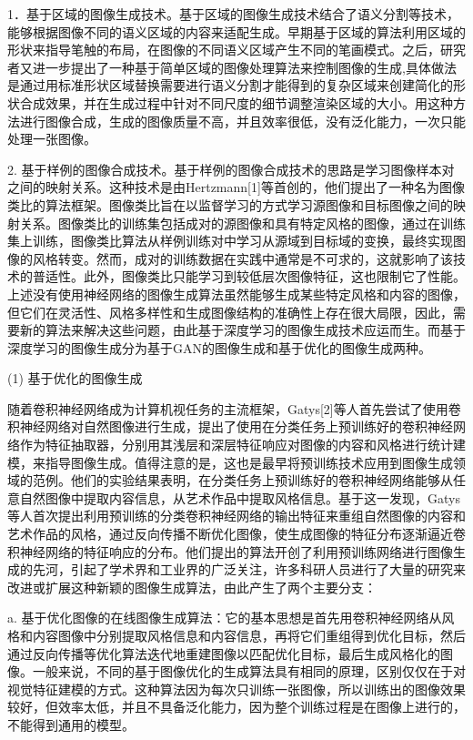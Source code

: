 1．基于区域的图像生成技术。基于区域的图像生成技术结合了语义分割等技术，能够根据图像不同的语义区域的内容来适配生成。早期基于区域的算法利用区域的形状来指导笔触的布局，在图像的不同语义区域产生不同的笔画模式。之后，研究者又进一步提出了一种基于简单区域的图像处理算法来控制图像的生成,具体做法是通过用标准形状区域替换需要进行语义分割才能得到的复杂区域来创建简化的形状合成效果，并在生成过程中针对不同尺度的细节调整渲染区域的大小。用这种方法进行图像合成，生成的图像质量不高，并且效率很低，没有泛化能力，一次只能处理一张图像。

2. 基于样例的图像合成技术。基于样例的图像合成技术的思路是学习图像样本对之间的映射关系。这种技术是由Hertzmann[1]等首创的，他们提出了一种名为图像类比的算法框架。图像类比旨在以监督学习的方式学习源图像和目标图像之间的映射关系。图像类比的训练集包括成对的源图像和具有特定风格的图像，通过在训练集上训练，图像类比算法从样例训练对中学习从源域到目标域的变换，最终实现图像的风格转变。然而，成对的训练数据在实践中通常是不可求的，这就影响了该技术的普适性。此外，图像类比只能学习到较低层次图像特征，这也限制它了性能。
上述没有使用神经网络的图像生成算法虽然能够生成某些特定风格和内容的图像，但它们在灵活性、风格多样性和生成图像结构的准确性上存在很大局限，因此，需要新的算法来解决这些问题，由此基于深度学习的图像生成技术应运而生。而基于深度学习的图像生成分为基于GAN的图像生成和基于优化的图像生成两种。

(1) 基于优化的图像生成

随着卷积神经网络成为计算机视任务的主流框架，Gatys[2]等人首先尝试了使用卷积神经网络对自然图像进行生成，提出了使用在分类任务上预训练好的卷积神经网络作为特征抽取器，分别用其浅层和深层特征响应对图像的内容和风格进行统计建模，来指导图像生成。值得注意的是，这也是最早将预训练技术应用到图像生成领域的范例。他们的实验结果表明，在分类任务上预训练好的卷积神经网络能够从任意自然图像中提取内容信息，从艺术作品中提取风格信息。基于这一发现，Gatys等人首次提出利用预训练的分类卷积神经网络的输出特征来重组自然图像的内容和艺术作品的风格，通过反向传播不断优化图像，使生成图像的特征分布逐渐逼近卷积神经网络的特征响应的分布。他们提出的算法开创了利用预训练网络进行图像生成的先河，引起了学术界和工业界的广泛关注，许多科研人员进行了大量的研究来改进或扩展这种新颖的图像生成算法，由此产生了两个主要分支：

a. 基于优化图像的在线图像生成算法：它的基本思想是首先用卷积神经网络从风格和内容图像中分别提取风格信息和内容信息，再将它们重组得到优化目标，然后通过反向传播等优化算法迭代地重建图像以匹配优化目标，最后生成风格化的图像。一般来说，不同的基于图像优化的生成算法具有相同的原理，区别仅仅在于对视觉特征建模的方式。这种算法因为每次只训练一张图像，所以训练出的图像效果较好，但效率太低，并且不具备泛化能力，因为整个训练过程是在图像上进行的，不能得到通用的模型。

